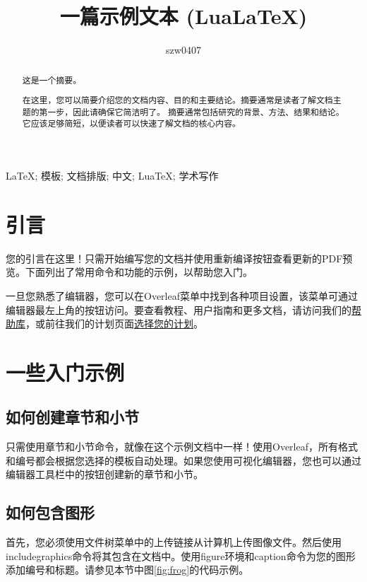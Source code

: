 \documentclass{article}
\title{一篇示例文本 (LuaLaTeX)}
\author{szw0407}
\begin{document}
\maketitle

\begin{abstract}
    这是一个摘要。

    在这里，您可以简要介绍您的文档内容、目的和主要结论。摘要通常是读者了解文档主题的第一步，因此请确保它简洁明了。
    摘要通常包括研究的背景、方法、结果和结论。它应该足够简短，以便读者可以快速了解文档的核心内容。
\end{abstract}

\begin{keywords}
    LaTeX; 模板; 文档排版; 中文; LuaTeX; 学术写作
\end{keywords}

\bigskip
\tableofcontents
\newpage
\section{引言}

您的引言在这里！只需开始编写您的文档并使用重新编译按钮查看更新的PDF预览。下面列出了常用命令和功能的示例，以帮助您入门。

一旦您熟悉了编辑器，您可以在Overleaf菜单中找到各种项目设置，该菜单可通过编辑器最左上角的按钮访问。要查看教程、用户指南和更多文档，请访问我们的\href{https://www.overleaf.com/learn}{帮助库}，或前往我们的计划页面\href{https://www.overleaf.com/user/subscription/plans}{选择您的计划}。

\section{一些入门示例}

\subsection{如何创建章节和小节}

只需使用章节和小节命令，就像在这个示例文档中一样！使用Overleaf，所有格式和编号都会根据您选择的模板自动处理。如果您使用可视化编辑器，您也可以通过编辑器工具栏中的按钮创建新的章节和小节。

\subsection{如何包含图形}

首先，您必须使用文件树菜单中的上传链接从计算机上传图像文件。然后使用includegraphics命令将其包含在文档中。使用figure环境和caption命令为您的图形添加编号和标题。请参见本节中图\ref{fig:frog}的代码示例。
\end{document}
